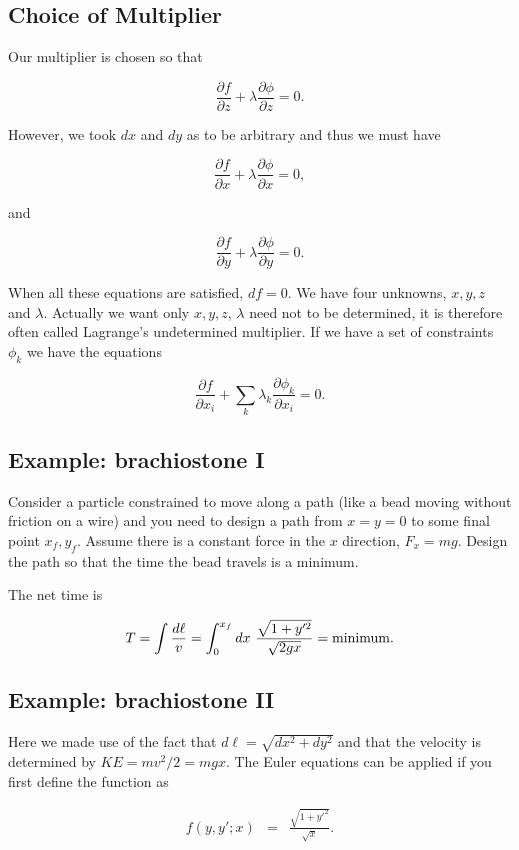 \documentclass[%
oneside,                 %
final,                   %
10pt]{article}
\begin{document}
\subsection*{Choice of Multiplier}

Our multiplier is chosen so that

\[
\frac{\partial f}{\partial z}+\lambda\frac{\partial \phi}{\partial z} =0.
\]

However, we took $dx$ and $dy$ as to be arbitrary and thus we must have

\[
\frac{\partial f}{\partial x}+\lambda\frac{\partial \phi}{\partial x} =0,
\]

and

\[
\frac{\partial f}{\partial y}+\lambda\frac{\partial \phi}{\partial y} =0.
\]

When all these equations are satisfied, $df=0$.  We have four
unknowns, $x,y,z$ and $\lambda$. Actually we want only $x,y,z$,
$\lambda$ need not to be determined, it is therefore often called
Lagrange's undetermined multiplier.  If we have a set of constraints
$\phi_k$ we have the equations

\[
\frac{\partial f}{\partial x_i}+\sum_k\lambda_k\frac{\partial \phi_k}{\partial x_i} =0.
\]

\subsection*{Example: brachiostone I}

Consider a particle constrained to move along a path (like a bead
moving without friction on a wire) and you need to design a path from
$x=y=0$ to some final point $x_f,y_f$. Assume there is a constant
force in the $x$ direction, $F_x=mg$. Design the path so that the time
the bead travels is a minimum.

The net time is

\[
T=\int \frac{d\ell}{v}=\int_0^{x_f} dx~\frac{\sqrt{1+y'^2}}{\sqrt{2gx}}={\rm minimum}.
\]

\subsection*{Example: brachiostone II}

Here we made use of the fact that $d\ell=\sqrt{dx^2+dy^2}$ and that
the velocity is determined by $KE=mv^2/2=mgx$. The Euler equations can
be applied if you first define the function as

\begin{eqnarray*}
f(y,y';x)&=&\frac{\sqrt{1+y'^2}}{\sqrt{x}}.
\end{eqnarray*}
\end{document}
